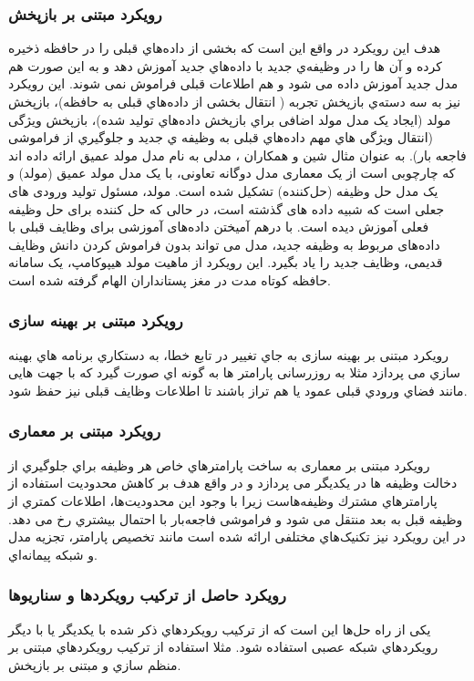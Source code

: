 \subsubsection{رویکرد مبتنی بر بازپخش}
هدف این رویکرد در واقع این است که بخشی از داده‌هاي قبلی را در حافظه ذخیره کرده و آن ها را در وظیفه‌ي جدید با داده‌هاي جدید آموزش دهد و به این صورت هم مدل جدید آموزش داده می شود و هم اطلاعات قبلی فراموش نمی شوند. این رویکرد نیز به سه دسته‌ي بازپخش تجربه 
( انتقال بخشی از داده‌هاي قبلی به حافظه)، بازپخش مولد 
(ایجاد یک مدل مولد اضافی براي بازپخش داده‌هاي تولید شده)، بازپخش ویژگی 
(انتقال ویژگی هاي مهم داده‌هاي قبلی به وظیفه ي جدید و جلوگیري از فراموشی فاجعه بار). به عنوان مثال شین و همکاران 
\cite{9}
، مدلی به نام مدل مولد عمیق ارائه داده اند که چارچوبی است از یک معماری مدل دوگانه تعاونی، با یک مدل مولد عمیق (مولد) و یک مدل حل وظیفه (حل‌کننده) تشکیل شده است. مولد، مسئول تولید ورودی های جعلی است که شبیه داده های گذشته است، در حالی که حل کننده برای حل وظیفه فعلی آموزش دیده است.  با درهم آمیختن داده‌های آموزشی برای وظایف قبلی با داده‌های مربوط به وظیفه جدید، مدل می تواند بدون فراموش کردن دانش وظایف قدیمی، وظایف جدید را یاد بگیرد. این رویکرد از ماهیت مولد هیپوکامپ، یک سامانه حافظه کوتاه مدت در مغز پستانداران الهام گرفته شده است. 
\subsubsection{رویکرد مبتنی بر بهینه سازی}
رویکرد مبتنی بر بهینه سازی 
به جاي تغییر در تابع خطا، به دستکاري برنامه هاي بهینه سازي می پردازد مثلا به روزرسانی پارامتر ها به گونه اي صورت گیرد که با جهت هایی مانند فضاي ورودي قبلی عمود یا هم تراز باشند تا اطلاعات وظایف قبلی نیز حفظ شود. 
\subsubsection{رویکرد مبتنی بر معماری}
رویکرد مبتنی بر معماری 
به ساخت پارامترهاي خاص هر وظیفه براي جلوگیري از دخالت وظیفه ها در یکدیگر می پردازد و در واقع هدف بر کاهش محدودیت استفاده از پارامترهاي مشترك وظیفه‌هاست زیرا با وجود این محدودیت‌ها، اطلاعات کمتري از وظیفه قبل به بعد منتقل می شود و فراموشی فاجعه‌بار با احتمال بیشتري رخ می دهد. در این رویکرد نیز تکنیک‌هاي مختلفی ارائه شده است مانند تخصیص پارامتر، تجزیه مدل و شبکه پیمانه‌اي.
\subsubsection{رویکرد حاصل از ترکیب رویکردها و سناریوها}
یکی از راه حل‌ها این است که از ترکیب رویکردهاي ذکر شده با یکدیگر یا با دیگر رویکردهاي شبکه عصبی استفاده شود. مثلا استفاده از ترکیب رویکردهاي مبتنی بر منظم سازي و مبتنی بر بازپخش.

